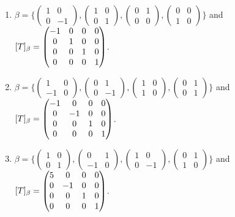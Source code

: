 \begin{enumerate}
\begin{enumerate}
\item $\beta =\{\begin{pmatrix}1&0\\0&-1\end{pmatrix},\begin{pmatrix}1&0\\0&1\end{pmatrix},\begin{pmatrix}0&1\\0&0\end{pmatrix},\begin{pmatrix}0&0\\1&0\end{pmatrix}\}$ and $[T]_{\beta }=\begin{pmatrix}-1 & 0 & 0 & 0\cr 0 & 1 & 0 & 0\cr 0 & 0 & 1 & 0\cr 0 & 0 & 0 & 1\end{pmatrix}$.
\item $\beta =\{\begin{pmatrix}1&0\\-1&0\end{pmatrix},\begin{pmatrix}0&1\\0&-1\end{pmatrix},\begin{pmatrix}1&0\\1&0\end{pmatrix},\begin{pmatrix}0&1\\0&1\end{pmatrix}\}$ and $[T]_{\beta }=\begin{pmatrix}-1 & 0 & 0 & 0\cr 0 & -1 & 0 & 0\cr 0 & 0 & 1 & 0\cr 0 & 0 & 0 & 1\end{pmatrix}$.
\item $\beta =\{\begin{pmatrix}1&0\\0&1\end{pmatrix},\begin{pmatrix}0&1\\-1&0\end{pmatrix},\begin{pmatrix}1&0\\0&-1\end{pmatrix},\begin{pmatrix}0&1\\1&0\end{pmatrix}\}$ and $[T]_{\beta }=\begin{pmatrix}5 & 0 & 0 & 0\cr 0 & -1 & 0 & 0\cr 0 & 0 & 1 & 0\cr 0 & 0 & 0 & 1\end{pmatrix}$.

\end{enumerate}
\end{enumerate}
